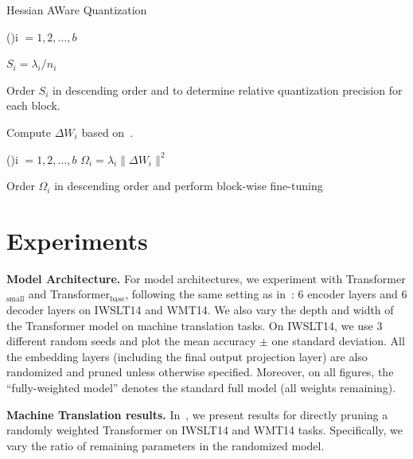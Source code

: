 \begin{algorithm}[t]
\DontPrintSemicolon
\caption{Hessian AWare Quantization}
\label{alg:hq}
    \SetAlgoLined

    \For(){i $=1,2,\ldots, b$}{

        $S_i = \lambda_i/n_i$ 
    }
    
    
    Order $S_i$ in descending order and to determine relative quantization precision for each block.
    
    Compute $\Delta W_i$ based on~.

    \For(\quad \quad \quad\quad\quad {}){i $=1,2,\ldots, b$}{
       $\Omega_i = \lambda_i\|\Delta W_i\|^2$ 
    }
    
    Order $\Omega_i$ in descending order and perform block-wise fine-tuning
\end{algorithm}




\section{Experiments}
\label{sec:empirical_results}


\noindent\textbf{Model Architecture.}
For model architectures, we experiment with Transformer$_\text{small}$ and Transformer$_\text{base}$, following the same setting as in~\citet{Ott:2018scaling}: 6 encoder layers and 6 decoder layers on IWSLT14 and WMT14. 
We also vary the depth and width of the Transformer model on machine translation tasks. 
On IWSLT14, we use 3 different random seeds and plot the mean accuracy $\pm$ one standard deviation. 
All the embedding layers (including the final output projection layer) are also randomized and pruned unless otherwise specified. 
Moreover, on all figures, the ``fully-weighted model'' denotes the standard full model (all weights remaining). 

\noindent\textbf{Machine Translation results.}
In~, we present results for directly pruning a randomly weighted Transformer on IWSLT14 and WMT14 tasks. 
Specifically, we vary the ratio of remaining parameters in the randomized model.

